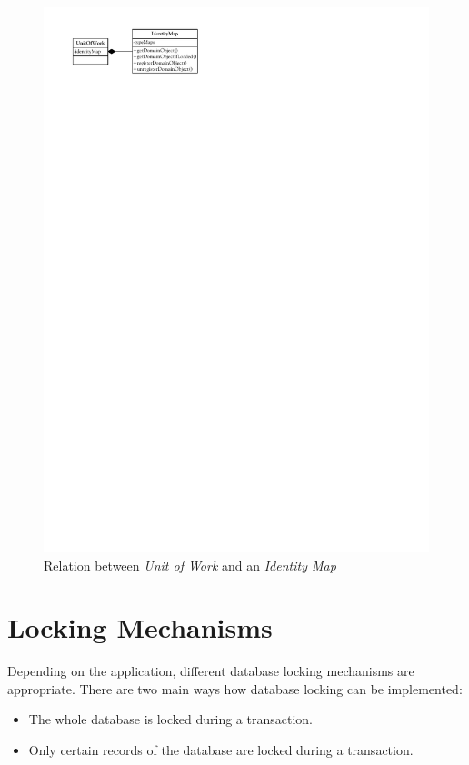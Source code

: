 		\begin{figure}[htb]
			\begin{center}
				\includegraphics{./files/inc/figures/designUoW_IdentityMap}
				\caption{\label{fig:designUoW_IdentityMap} Relation between \textit{Unit of Work} and an \textit{Identity Map}}
			\end{center}
		\end{figure}
		
	\section{Locking Mechanisms}
	\label{sec:lockingMechanisms}
		Depending on the application, different database locking mechanisms are appropriate. There are two
		main ways how database locking can be implemented:
		
		\begin{itemize}
			\item	The whole database is locked during a transaction. 
			\item Only certain records of the database are locked during a transaction.
		\end{itemize}
		
